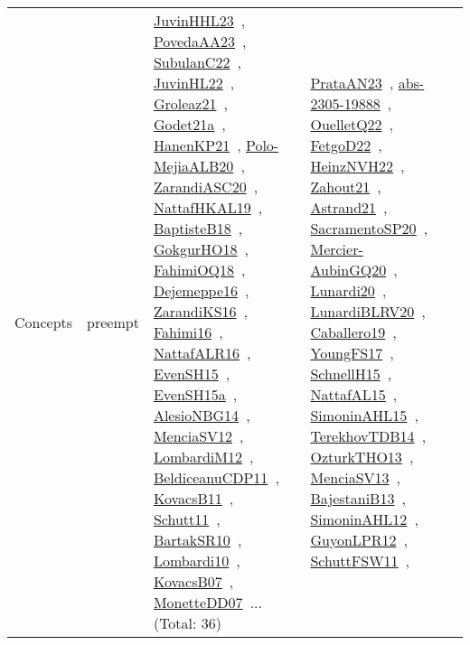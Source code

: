 {\begin{longtable}{lp{3cm}>{\raggedright\arraybackslash}p{6cm}>{\raggedright\arraybackslash}p{6cm}>{\raggedright\arraybackslash}p{8cm}}
Concepts & preempt & \href{works/JuvinHHL23.pdf}{JuvinHHL23}~\cite{JuvinHHL23}, \href{works/PovedaAA23.pdf}{PovedaAA23}~\cite{PovedaAA23}, \href{works/SubulanC22.pdf}{SubulanC22}~\cite{SubulanC22}, \href{works/JuvinHL22.pdf}{JuvinHL22}~\cite{JuvinHL22}, \href{works/Groleaz21.pdf}{Groleaz21}~\cite{Groleaz21}, \href{works/Godet21a.pdf}{Godet21a}~\cite{Godet21a}, \href{works/HanenKP21.pdf}{HanenKP21}~\cite{HanenKP21}, \href{works/Polo-MejiaALB20.pdf}{Polo-MejiaALB20}~\cite{Polo-MejiaALB20}, \href{works/ZarandiASC20.pdf}{ZarandiASC20}~\cite{ZarandiASC20}, \href{works/NattafHKAL19.pdf}{NattafHKAL19}~\cite{NattafHKAL19}, \href{works/BaptisteB18.pdf}{BaptisteB18}~\cite{BaptisteB18}, \href{works/GokgurHO18.pdf}{GokgurHO18}~\cite{GokgurHO18}, \href{works/FahimiOQ18.pdf}{FahimiOQ18}~\cite{FahimiOQ18}, \href{works/Dejemeppe16.pdf}{Dejemeppe16}~\cite{Dejemeppe16}, \href{works/ZarandiKS16.pdf}{ZarandiKS16}~\cite{ZarandiKS16}, \href{works/Fahimi16.pdf}{Fahimi16}~\cite{Fahimi16}, \href{works/NattafALR16.pdf}{NattafALR16}~\cite{NattafALR16}, \href{works/EvenSH15.pdf}{EvenSH15}~\cite{EvenSH15}, \href{works/EvenSH15a.pdf}{EvenSH15a}~\cite{EvenSH15a}, \href{works/AlesioNBG14.pdf}{AlesioNBG14}~\cite{AlesioNBG14}, \href{works/MenciaSV12.pdf}{MenciaSV12}~\cite{MenciaSV12}, \href{works/LombardiM12.pdf}{LombardiM12}~\cite{LombardiM12}, \href{works/BeldiceanuCDP11.pdf}{BeldiceanuCDP11}~\cite{BeldiceanuCDP11}, \href{works/KovacsB11.pdf}{KovacsB11}~\cite{KovacsB11}, \href{works/Schutt11.pdf}{Schutt11}~\cite{Schutt11}, \href{works/BartakSR10.pdf}{BartakSR10}~\cite{BartakSR10}, \href{works/Lombardi10.pdf}{Lombardi10}~\cite{Lombardi10}, \href{works/KovacsB07.pdf}{KovacsB07}~\cite{KovacsB07}, \href{works/MonetteDD07.pdf}{MonetteDD07}~\cite{MonetteDD07}... (Total: 36) & \href{works/PrataAN23.pdf}{PrataAN23}~\cite{PrataAN23}, \href{works/abs-2305-19888.pdf}{abs-2305-19888}~\cite{abs-2305-19888}, \href{works/OuelletQ22.pdf}{OuelletQ22}~\cite{OuelletQ22}, \href{works/FetgoD22.pdf}{FetgoD22}~\cite{FetgoD22}, \href{works/HeinzNVH22.pdf}{HeinzNVH22}~\cite{HeinzNVH22}, \href{works/Zahout21.pdf}{Zahout21}~\cite{Zahout21}, \href{works/Astrand21.pdf}{Astrand21}~\cite{Astrand21}, \href{works/SacramentoSP20.pdf}{SacramentoSP20}~\cite{SacramentoSP20}, \href{works/Mercier-AubinGQ20.pdf}{Mercier-AubinGQ20}~\cite{Mercier-AubinGQ20}, \href{works/Lunardi20.pdf}{Lunardi20}~\cite{Lunardi20}, \href{works/LunardiBLRV20.pdf}{LunardiBLRV20}~\cite{LunardiBLRV20}, \href{works/Caballero19.pdf}{Caballero19}~\cite{Caballero19}, \href{works/YoungFS17.pdf}{YoungFS17}~\cite{YoungFS17}, \href{works/SchnellH15.pdf}{SchnellH15}~\cite{SchnellH15}, \href{works/NattafAL15.pdf}{NattafAL15}~\cite{NattafAL15}, \href{works/SimoninAHL15.pdf}{SimoninAHL15}~\cite{SimoninAHL15}, \href{works/TerekhovTDB14.pdf}{TerekhovTDB14}~\cite{TerekhovTDB14}, \href{works/OzturkTHO13.pdf}{OzturkTHO13}~\cite{OzturkTHO13}, \href{works/MenciaSV13.pdf}{MenciaSV13}~\cite{MenciaSV13}, \href{works/BajestaniB13.pdf}{BajestaniB13}~\cite{BajestaniB13}, \href{works/SimoninAHL12.pdf}{SimoninAHL12}~\cite{SimoninAHL12}, \href{works/GuyonLPR12.pdf}{GuyonLPR12}~\cite{GuyonLPR12}, \href{works/SchuttFSW11.pdf}{SchuttFSW11}~\cite{SchuttFSW11}, 
\end{longtable}}
